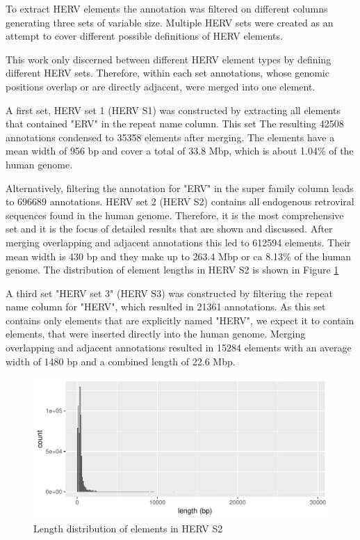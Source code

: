 \documentclass[a4paper,12pt,twoside,openright]{report}
\begin{document}
To extract HERV elements the annotation was filtered on different columns generating three sets of variable size. Multiple HERV sets were created as an attempt to cover different possible definitions of HERV elements.

This work only discerned between different HERV element types by defining different HERV sets. Therefore, within each set annotations, whose genomic positions overlap or are directly adjacent, were merged into one element.

A first set, HERV set 1 (HERV S1) was constructed by extracting all elements that contained "ERV" in the repeat name column. This set
The resulting 42508 annotations condensed to 35358 elements after merging. The elements have a mean width of 956 bp and cover a total of 33.8 Mbp, which is about 1.04\% of the human genome.  

Alternatively, filtering the annotation for "ERV" in the super family column leads to 696689 annotations. HERV set 2 (HERV S2) contains all endogenous retroviral sequences found in the human genome. Therefore, it is the most comprehensive set and it is the focus of detailed results that are shown and discussed. After merging overlapping and adjacent annotations this led to 612594 elements. Their mean width is 430 bp and they make up to 263.4 Mbp or ca 8.13\% of the human genome. The distribution of element lengths in HERV S2 is shown in Figure \ref{fig:hervS2.length.hist} 

A third set "HERV set 3" (HERV S3) was constructed by filtering the repeat name column for "HERV", which resulted in 21361 annotations. As this set contains only elements that are explicitly named "HERV", we expect it to contain elements, that were inserted directly into the human genome. Merging overlapping and adjacent annotations resulted in 15284 elements with an average width of 1480 bp and a combined length of 22.6 Mbp.

\begin{figure}[tb]
	\includegraphics[scale = 1, keepaspectratio = true]{../figures/hervS2_length_hist}  
	\caption{Length distribution of elements in HERV S2}
    \label{fig:hervS2.length.hist}
\end{figure}
\end{document}
